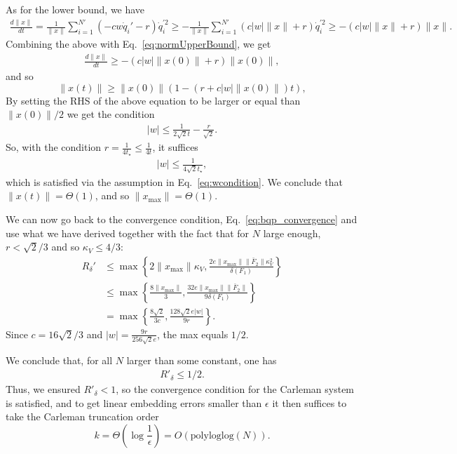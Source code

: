 \documentclass[superscriptaddress,onecolumn,nofootinbib,longbibliography,a4paper,accepted=2026-09-29]{quantumarticle}
\theoremstyle{plain}
\theoremstyle{definition}
\numberwithin{thm}{section}
\numberwithin{assumption}{section}
\numberwithin{lemma}{section}
\numberwithin{prop}{section}
\numberwithin{cor}{section}
\numberwithin{definition}{section}
\numberwithin{rmk}{section}
\numberwithin{equation}{section}
\begin{document}
As for the lower bound, we have
\begin{align}
    {\frac{d \|x\|}{dt}} = \frac{1}{\|x\|}\sum_{i=1}^{N'} (-cw\dot{q}_i'-r) \dot{q}_i^{\prime 2} \geq   -\frac{1}{\|x\|}\sum_{i=1}^{N'} (c|w|\|x\|+r) \dot{q}_i^{\prime 2} \geq -(c|w|\|x\|+r)\|x\|.
\end{align}
Combining the above with Eq.~\eqref{eq:normUpperBound}, we get
\begin{align}
    {\frac{d \|x\|}{dt}}  \geq -(c|w|\|x(0)\|+r)\|x(0)\|,
\end{align}
and so
\begin{equation}
    \|x(t)\| \geq \|x(0)\|(1 - (r+c|w|\|x(0)\|) t),
\end{equation}
By setting the RHS of the above equation to be larger or equal than $\|x(0)\|/2$ we get the condition
\begin{align}
    |w| \leq \frac{1}{2 \sqrt{2} t} - \frac{r}{\sqrt{2}}.
\end{align}
So, with the condition $r= \frac{1}{4t_\star} \leq \frac{1}{4t}$, it suffices
\begin{align}
    |w| \leq \frac{1}{4 \sqrt{2} t_\star},
\end{align}
which is satisfied via the assumption in Eq.~\eqref{eq:wcondition}. We conclude that $\|x(t)\| = \Theta(1)$, and so $\|x_{\mathrm{max}}\|= \Theta(1)$.

We can now go back to the convergence condition, Eq.~\eqref{eq:bqp_convergence} and use what we have derived together with the fact that for $N$ large enough, $r < \sqrt{2}/3$ and so $\kappa_V \leq 4/3$:
\begin{align}
    R_\delta' & \leq \max\left\{2 \|x_{\mathrm{max}}\| \kappa_V, \frac{2e\|x_{\mathrm{max}}\|\|\bar{F}_2\|\kappa_V^2}{\delta(F_1)}\right\}
    \\ & \leq \max\left\{\frac{8 \|x_{\mathrm{max}}\|}{3}, \frac{32e\|x_{\mathrm{max}}\|\|\bar{F}_2\|}{9\delta(F_1)}\right\}
        \\ & = \max\left\{\frac{8 \sqrt{2}}{3c}, \frac{128\sqrt{2} e|w|}{9 r}\right\}.
\end{align}
Since $c = 16 \sqrt{2}/3$ and $|w|= \frac{9r}{256 \sqrt{2} e}$, the max equals $1/2$.

We conclude that, for all $N$ larger than some constant, one has
\begin{align}
       R'_\delta  \leq 1/2.
\end{align}
Thus, we ensured $R'_{\delta}<1$, so the convergence condition for the Carleman system is satisfied, and to get linear embedding errors smaller than $\epsilon$ it then suffices to take the Carleman truncation order
\begin{equation}
    k = \Theta \left(\log\frac{1}{\epsilon}\right)= O (\mathrm{polyloglog}(N)).
\end{equation}
\end{document}
